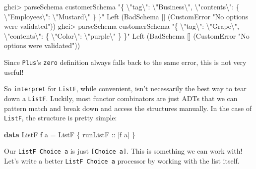 \documentclass[]{article}
\newenvironment{Shaded}{}{}
\newcommand{\DataTypeTok}[1]{\textcolor[rgb]{0.56,0.13,0.00}{#1}}
\newcommand{\KeywordTok}[1]{\textcolor[rgb]{0.00,0.44,0.13}{\textbf{#1}}}
\newcommand{\NormalTok}[1]{#1}
\newcommand{\OperatorTok}[1]{\textcolor[rgb]{0.40,0.40,0.40}{#1}}
\newcommand{\OtherTok}[1]{\textcolor[rgb]{0.00,0.44,0.13}{#1}}
\newcommand{\StringTok}[1]{\textcolor[rgb]{0.25,0.44,0.63}{#1}}
\begin{document}
\begin{Shaded}
\begin{Highlighting}[]
\NormalTok{ghci}\OperatorTok{>}\NormalTok{ parseSchema customerSchema  }\StringTok{"\{ \textbackslash{}"tag\textbackslash{}": \textbackslash{}"Business\textbackslash{}", \textbackslash{}"contents\textbackslash{}": \{ \textbackslash{}"Employees\textbackslash{}": \textbackslash{}"Mustard\textbackslash{}" \} \}"}
\DataTypeTok{Left}\NormalTok{ (}\DataTypeTok{BadSchema}\NormalTok{ [] (}\DataTypeTok{CustomError} \StringTok{"No options were validated"}\NormalTok{))}
\NormalTok{ghci}\OperatorTok{>}\NormalTok{ parseSchema customerSchema  }\StringTok{"\{ \textbackslash{}"tag\textbackslash{}": \textbackslash{}"Grape\textbackslash{}", \textbackslash{}"contents\textbackslash{}": \{ \textbackslash{}"Color\textbackslash{}": \textbackslash{}"purple\textbackslash{}" \} \}"}
\DataTypeTok{Left}\NormalTok{ (}\DataTypeTok{BadSchema}\NormalTok{ [] (}\DataTypeTok{CustomError} \StringTok{"No options were validated"}\NormalTok{))}
\end{Highlighting}
\end{Shaded}

Since \texttt{Plus}'s \texttt{zero} definition always falls back to the same
error, this is not very useful!

So \texttt{interpret} for \texttt{ListF}, while convenient, isn't necessarily
the best way to tear down a \texttt{ListF}. Luckily, most functor combinators
are just ADTs that we can pattern match and break down and access the structures
manually. In the case of \texttt{ListF}, the structure is pretty simple:

\begin{Shaded}
\begin{Highlighting}[]
\KeywordTok{data} \DataTypeTok{ListF}\NormalTok{ f a }\OtherTok{=} \DataTypeTok{ListF}\NormalTok{ \{}\OtherTok{ runListF ::}\NormalTok{ [f a] \}}
\end{Highlighting}
\end{Shaded}

Our \texttt{ListF\ Choice\ a} is just \texttt{{[}Choice\ a{]}}. This is
something we can work with! Let's write a better \texttt{ListF\ Choice\ a}
processor by working with the list itself.
\end{document}
